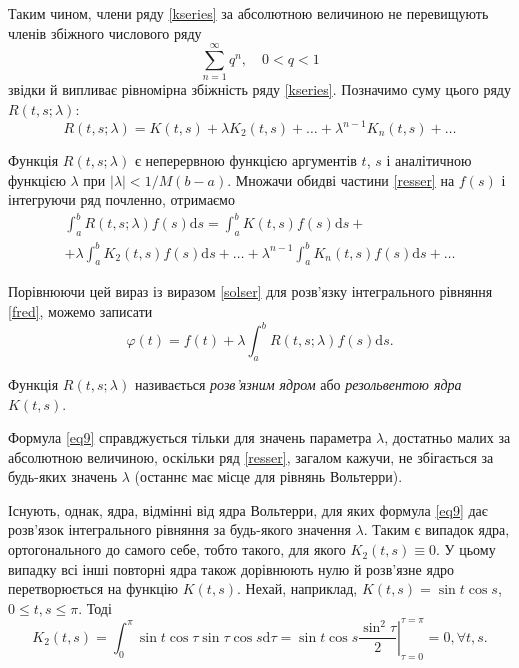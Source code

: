 \documentclass[14pt,twoside]{extreport}
\theoremstyle{mystyle}
\numberwithin{equation}{chapter}
\begin{document}
Таким чином, члени ряду \eqref{kseries} за абсолютною величиною не перевищують членів збіжного числового ряду
\[
 \sum_{n=1}^{\infty} q^n, \quad 0<q<1
\]
звідки й випливає рівномірна збіжність ряду \eqref{kseries}. Позначимо суму цього ряду $R(t, s; \lambda)$:
\begin{equation}\label{resser}
 R(t, s; \lambda) = K(t, s) + \lambda K_2(t, s) + \ldots + \lambda^{n-1} K_n(t, s) + \ldots
\end{equation}

Функція $R(t, s; \lambda)$ є неперервною функцією аргументів $t$, $s$ і аналітичною функцією $\lambda$ при $|\lambda| < 1/M(b-a)$. Множачи обидві частини \eqref{resser} на $f(s)$ і інтегруючи ряд почленно, отримаємо
\begin{multline*}
 \int_{a}^{b} R(t, s; \lambda) f(s) \mathrm{d}s = \int_{a}^{b} K(t,s) f(s)\mathrm{d}s +\\
 + \lambda\int_{a}^{b} K_2(t,s) f(s)\mathrm{d}s+ \ldots + \lambda^{n-1}\int_{a}^{b} K_n(t,s) f(s)\mathrm{d}s + \ldots
\end{multline*}

Порівнюючи цей вираз із виразом \eqref{solser} для розв'язку інтегрального рівняння \eqref{fred}, можемо записати
\begin{equation}\label{eq9}
 \varphi(t)= f(t) + \lambda \int_{a}^{b} R(t, s; \lambda) f(s) \mathrm{d}s.
\end{equation}

Функція $R(t, s; \lambda)$ називається \emph{розв'язним ядром} або \emph{резольвентою ядра} $K(t, s)$.

Формула \eqref{eq9} справджується тільки для значень параметра $\lambda$, достатньо малих за абсолютною величиною, оскільки ряд \eqref{resser}, загалом кажучи, не збігається за будь-яких значень $\lambda$ (останнє має місце для рівнянь Вольтерри).

Існують, однак, ядра, відмінні від ядра Вольтерри, для яких формула \eqref{eq9} дає розв'язок інтегрального рівняння за будь-якого значення $\lambda$. Таким є випадок ядра, ортогонального до самого себе, тобто такого, для якого $K_2 (t, s) \equiv 0$. У цьому випадку всі інші повторні ядра також дорівнюють нулю й розв'язне ядро перетворюється на функцію $K(t, s)$. Нехай, наприклад, $K(t, s) = \sin t \cos s$, $0\leqslant t, s \leqslant \pi$. Тоді
\[
 K_2(t, s) = \int_{0}^{\pi} \sin t \cos \tau \sin \tau \cos s \mathrm{d} \tau = \sin t \cos s \left. \frac{\sin^2 \tau}{2}\right|^{\tau = \pi}_{\tau = 0}=0, \forall t, s.
\]
\end{document}
